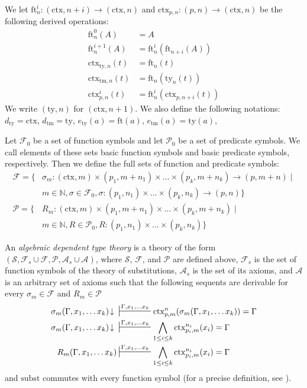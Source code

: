 \documentclass[reqno]{amsart}
\theoremstyle{definition}
\theoremstyle{remark}
\newcommand{\fs}[1]{\mathrm{#1}}
\newcommand{\subst}{\fs{subst}}
\newcommand{\ft}{\fs{ft}}
\newcommand{\ty}{\fs{ty}}
\newcommand{\ctx}{\fs{ctx}}
\newcommand{\tm}{\fs{tm}}
\numberwithin{figure}{section}
\begin{document}
We let $\ft^i_n : (\ctx,n+i) \to (\ctx,n)$ and $\ctx_{p,n} : (p,n) \to (\ctx,n)$ be the following derived operations:
\begin{align*}
\ft^0_n(A)      & = A \\
\ft^{i+1}_n(A)  & = \ft^i_n(\ft_{n+i}(A)) \\
\ctx_{\ty,n}(t) & = \ft_n(t) \\
\ctx_{\tm,n}(t) & = \ft_n(\ty_n(t)) \\
\ctx^i_{p,n}(t) & = \ft^i_n(\ctx_{p,n+i}(t))
\end{align*}
We write $(\ty,n)$ for $(\ctx,n+1)$.
We also define the following notations: $d_\ty = \ctx$, $d_\tm = \ty$, $e_\ty(a) = \ft(a)$, $e_\tm(a) = \ty(a)$,

Let $\mathcal{F}_0$ be a set of function symbols and let $\mathcal{P}_0$ be a set of predicate symbols.
We call elements of these sets basic function symbols and basic predicate symbols, respectively.
Then we define the full sets of function and predicate symbols:
\begin{align*}
\mathcal{F} = \{ & \sigma_m : (\ctx,m) \times (p_1,m+n_1) \times \ldots \times (p_k,m+n_k) \to (p,m+n) \mid \\
                 & m \in \mathbb{N}, \sigma \in \mathcal{F}_0, \sigma : (p_1,n_1) \times \ldots \times (p_k,n_k) \to (p,n) \} \\
\mathcal{P} = \{ & R_m : (\ctx,m) \times (p_1,m+n_1) \times \ldots \times (p_k,m+n_k) \mid \\
                 & m \in \mathbb{N}, R \in \mathcal{P}_0, R : (p_1,n_1) \times \ldots \times (p_k,n_k) \}
\end{align*}

An \emph{algebraic dependent type theory} is a theory of the form $(\mathcal{S}, \mathcal{F}_s \cup \mathcal{F}, \mathcal{P}, \mathcal{A}_s \cup \mathcal{A})$, where $\mathcal{S}$, $\mathcal{F}$, and $\mathcal{P}$ are defined above,
$\mathcal{F}_s$ is the set of function symbols of the theory of substitutions, $\mathcal{A}_s$ is the set of its axioms, and $\mathcal{A}$ is an arbitrary set of axioms such that the following sequents are derivable for every $\sigma_m \in \mathcal{F}$ and $R_m \in \mathcal{P}$
\begin{align*}
\sigma_m(\Gamma, x_1, \ldots x_k)\!\downarrow\ & \sststile{}{\Gamma, x_1, \ldots x_k} \ctx^n_{p,m}(\sigma_m(\Gamma, x_1, \ldots x_k)) = \Gamma \\
\sigma_m(\Gamma, x_1, \ldots x_k)\!\downarrow\ & \sststile{}{\Gamma, x_1, \ldots x_k} \bigwedge_{1 \leq i \leq k} \ctx^{n_i}_{p_i,m}(x_i) = \Gamma \\
R_m(\Gamma, x_1, \ldots x_k) & \sststile{}{\Gamma, x_1, \ldots x_k} \bigwedge_{1 \leq i \leq k} \ctx^{n_i}_{p_i,m}(x_i) = \Gamma
\end{align*}
and $\subst$ commutes with every function symbol (for a precise definition, see \cite[Definition~4.5]{alg-tt}).
\end{document}

